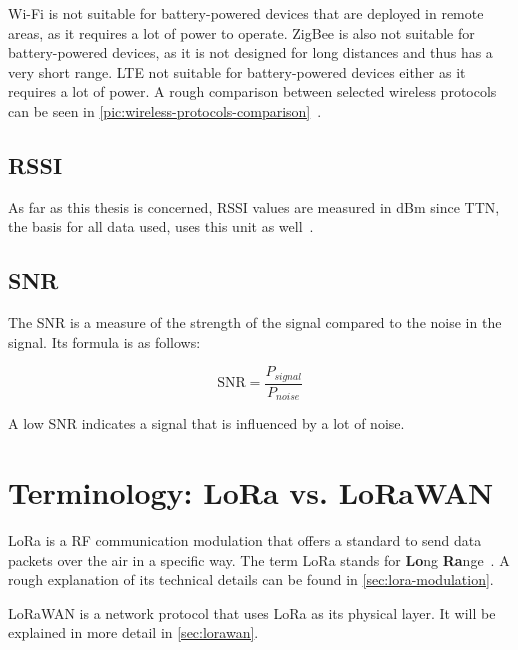 Wi-Fi is not suitable for battery-powered devices that are deployed in remote areas, as it requires a lot of power to operate.
ZigBee is also not suitable for battery-powered devices, as it is not designed for long distances and thus has a very short range.
\ac{LTE} not suitable for battery-powered devices either as it requires a lot of power.
A rough comparison between selected wireless protocols can be seen in \cref{pic:wireless-protocols-comparison}~\cite{wang_comparison_2021}.

\subsection{\acf{RSSI}}


As far as this thesis is concerned, \ac{RSSI} values are measured in dBm since \ac{TTN}, the basis for all data used, uses this unit as well~\cite{the_things_industries_bv_data_2023}.

\subsection{\acf{SNR}}


The \acf{SNR} is a measure of the strength of the signal compared to the noise in the signal.
Its formula is as follows:

\begin{equation}
    \text{SNR} = \frac{P_{signal}}{P_{noise}}
\end{equation}

A low \ac{SNR} indicates a signal that is influenced by a lot of noise.

\section{Terminology: \acs{LoRa} vs. \acs{LoRaWAN}}


\ac{LoRa} is a \ac{RF} communication modulation that offers a standard to send data packets over the air in a specific way.
The term \ac{LoRa} stands for \textbf{Lo}ng \textbf{Ra}nge~\cite{semtech_corporation_lora_2023}.
A rough explanation of its technical details can be found in \cref{sec:lora-modulation}.

\ac{LoRaWAN} is a network protocol that uses \ac{LoRa} as its physical layer.
It will be explained in more detail in \cref{sec:lorawan}.

